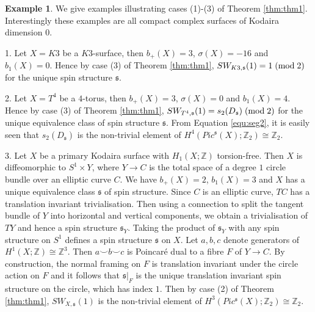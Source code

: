 \documentclass{amsart}
\theoremstyle{definition}
\newtheorem{example}[theorem]{Example}
\theoremstyle{remark}
\numberwithin{equation}{section}
\begin{document}
\begin{example}\label{ex:kod0}
We give examples illustrating cases (1)-(3) of Theorem \ref{thm:thm1}. Interestingly these examples are all compact complex surfaces of Kodaira dimension $0$.

1. Let $X = K3$ be a $K3$-surface, then $b_+(X) = 3$, $\sigma(X) = -16$ and $b_1(X) = 0$. Hence by case (3) of Theorem \ref{thm:thm1}, $SW_{K3 , \mathfrak{s}}(1) = 1 \; ({\rm mod} \; 2)$ for the unique spin structure $\mathfrak{s}$.

2. Let $X = T^4$ be a $4$-torus, then $b_+(X) = 3$, $\sigma(X) = 0$ and $b_1(X) = 4$. Hence by case (3) of Theorem \ref{thm:thm1}, $SW_{T^4,\mathfrak{s}}(1) = s_2(D_\mathfrak{s}) \; ({\rm mod} \; 2)$ for the unique equivalence class of spin structure $\mathfrak{s}$. From Equation \ref{equ:seg2}, it is easily seen that $s_2(D_\mathfrak{s})$ is the non-trivial element of $H^4( Pic^{\mathfrak{s}}(X) ; \mathbb{Z}_2) \cong \mathbb{Z}_2$.
 
3. Let $X$ be a primary Kodaira surface with $H_1(X ; \mathbb{Z})$ torsion-free. Then $X$ is diffeomorphic to $S^1 \times Y$, where $Y \to C$ is the total space of a degree $1$ circle bundle over an elliptic curve $C$. We have $b_+(X) = 2$, $b_1(X) = 3$ and $X$ has a unique equivalence class $\mathfrak{s}$ of spin structure. Since $C$ is an elliptic curve, $TC$ has a translation invariant trivialisation. Then using a connection to split the tangent bundle of $Y$ into horizontal and vertical components, we obtain a trivialisation of $TY$ and hence a spin structure $\mathfrak{s}_Y$. Taking the product of $\mathfrak{s}_Y$ with any spin structure on $S^1$ defines a spin structure $\mathfrak{s}$ on $X$. Let $a,b,c$ denote generators of $H^1(X ; \mathbb{Z}) \cong \mathbb{Z}^3$. Then $a \smallsmile b \smallsmile c$ is Poincar\'e dual to a fibre $F$ of $Y \to C$. By construction, the normal framing on $F$ is translation invariant under the circle action on $F$ and it follows that $\mathfrak{s}|_F$ is the unique translation invariant spin structure on the circle, which has index $1$. Then by case (2) of Theorem \ref{thm:thm1}, $SW_{X,\mathfrak{s}}(1)$ is the non-trivial element of $H^3( Pic^{\mathfrak{s}}(X) ; \mathbb{Z}_2) \cong \mathbb{Z}_2$.


\end{example}
\end{document}
